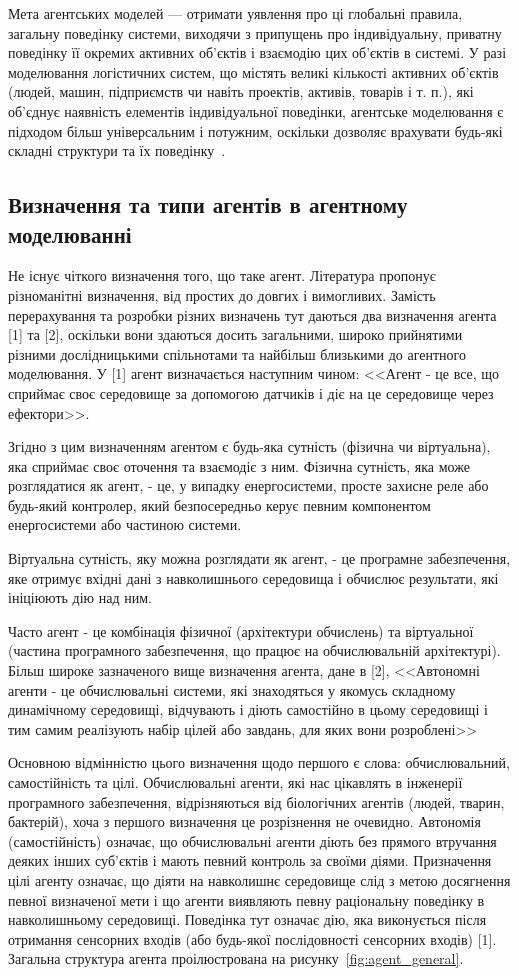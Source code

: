 Мета агентських моделей --- отримати уявлення про ці глобальні правила, загальну поведінку системи, виходячи з припущень про індивідуальну, приватну поведінку її окремих активних об'єктів і взаємодію цих об'єктів в системі.
У разі моделювання логістичних систем, що містять великі кількості активних об'єктів (людей, машин, підприємств чи навіть проектів, активів, товарів і т. п.), які об'єднує наявність елементів індивідуальної поведінки, агентське моделювання є підходом більш універсальним і потужним, оскільки дозволяє врахувати будь-які складні структури та їх поведінку~\cite{Shamrin2016}.

\subsection{Визначення та типи агентів в агентному моделюванні}
Не існує чіткого визначення того, що таке агент. Література пропонує різноманітні визначення, від простих до довгих і вимогливих.
Замість перерахування та розробки різних визначень тут даються два визначення агента [1] та [2], оскільки вони здаються досить загальними, широко прийнятими різними дослідницькими спільнотами та найбільш близькими до агентного моделювання. У [1] агент визначається наступним чином:
<<Агент - це все, що сприймає своє середовище за допомогою датчиків і діє на це середовище через ефектори>>.

Згідно з цим визначенням агентом є будь-яка сутність (фізична чи віртуальна), яка сприймає своє оточення та взаємодіє з ним.
Фізична сутність, яка може розглядатися як агент, - це, у випадку енергосистеми, просте захисне реле або будь-який контролер, який безпосередньо керує певним компонентом енергосистеми або частиною системи.

Віртуальна сутність, яку можна розглядати як агент, - це програмне забезпечення, яке отримує вхідні дані з навколишнього середовища і обчислює результати, які ініціюють дію над ним.

Часто агент - це комбінація фізичної (архітектури обчислень) та віртуальної (частина програмного забезпечення, що працює на обчислювальній архітектурі).
Більш широке зазначеного вище визначення агента, дане в [2],
<<Автономні агенти - це обчислювальні системи, які знаходяться у якомусь складному динамічному середовищі, відчувають і діють самостійно в цьому середовищі і тим самим реалізують набір цілей або завдань, для яких вони розроблені>>

Основною відмінністю цього визначення щодо першого є слова: обчислювальний, самостійність та цілі. Обчислювальні агенти, які нас цікавлять в інженерії програмного забезпечення, відрізняються від біологічних агентів (людей, тварин, бактерій), хоча з першого визначення це розрізнення не очевидно. Автономія (самостійність) означає, що обчислювальні агенти діють без прямого втручання деяких інших суб'єктів і мають певний контроль за своїми діями. Призначення цілі агенту означає, що діяти на навколишнє середовище слід з метою досягнення певної визначеної мети і що агенти виявляють певну раціональну поведінку в навколишньому середовищі. Поведінка тут означає дію, яка виконується після отримання сенсорних входів (або будь-якої послідовності сенсорних входів) [1].
Загальна структура агента проілюстрована на рисунку~\ref{fig:agent_general}.

